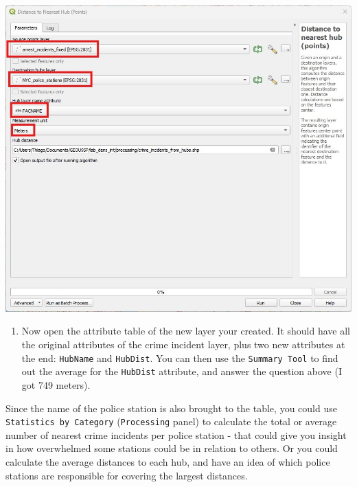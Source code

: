 \documentclass[
  letterpaper,
  DIV=11,
  numbers=noendperiod]{scrreprt}
\providecommand{\tightlist}{%
  \setlength{\itemsep}{0pt}\setlength{\parskip}{0pt}}\usepackage{longtable,booktabs,array}
\begin{document}
\includegraphics{images/lab_13/lab_13_fig_distohubs.jpg}

\begin{enumerate}
\def\labelenumi{(\arabic{enumi})}
\setcounter{enumi}{347}
\tightlist
\item
  Now open the attribute table of the new layer your created. It should
  have all the original attributes of the crime incident layer, plus two
  new attributes at the end: \texttt{HubName} and \texttt{HubDist}. You
  can then use the \texttt{Summary\ Tool} to find out the average for
  the \texttt{HubDist} attribute, and answer the question above (I got
  749 meters).
\end{enumerate}

\begin{tcolorbox}[enhanced jigsaw, coltitle=black, toprule=.15mm, breakable, opacitybacktitle=0.6, left=2mm, colback=white, leftrule=.75mm, rightrule=.15mm, colbacktitle=quarto-callout-tip-color!10!white, toptitle=1mm, titlerule=0mm, colframe=quarto-callout-tip-color-frame, arc=.35mm, bottomtitle=1mm, opacityback=0, bottomrule=.15mm, title=\textcolor{quarto-callout-tip-color}{\faLightbulb}\hspace{0.5em}{Tip}]

Since the name of the police station is also brought to the table, you
could use \texttt{Statistics\ by\ Category} (\texttt{Processing} panel)
to calculate the total or average number of nearest crime incidents per
police station - that could give you insight in how overwhelmed some
stations could be in relation to others. Or you could calculate the
average distances to each hub, and have an idea of which police stations
are responsible for covering the largest distances.

\end{tcolorbox}
\end{document}
